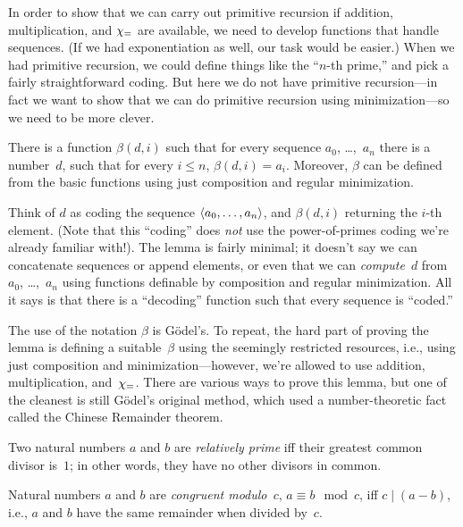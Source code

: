 \documentclass[../../../include/open-logic-section]{subfiles}
\begin{document}


In order to show that we can carry out primitive recursion if
addition, multiplication, and $\chi_{=}$ are available, we need to
develop functions that handle sequences. (If we had exponentiation as
well, our task would be easier.) When we had primitive recursion, we
could define things like the ``$n$-th prime,'' and pick a fairly
straightforward coding. But here we do not have primitive
recursion---in fact we want to show that we can do primitive recursion
using minimization---so we need to be more clever.  

\begin{lem}
There is a function $\beta(d,i)$ such that for every sequence $a_0$,
\dots,~$a_n$ there is a number~$d$, such that for every $i \le n$,
$\beta(d,i) = a_i$. Moreover, $\beta$ can be defined from the basic
functions using just composition and regular minimization.
\end{lem}

Think of $d$ as coding the sequence $\langle a_0, \dots, a_n \rangle$, and
$\beta(d,i)$ returning the $i$-th element. (Note that this ``coding''
does \emph{not} use the power-of-primes coding we're already familiar
with!). The lemma is fairly minimal; it doesn't say we can concatenate
sequences or append elements, or even that we can \emph{compute}~$d$
from $a_0$, \dots,~$a_n$ using functions definable by composition and
regular minimization. All it says is that there is a ``decoding''
function such that every sequence is ``coded.''

The use of the notation $\beta$ is G\"odel's. To repeat, the hard part
of proving the lemma is defining a suitable~$\beta$ using the
seemingly restricted resources, i.e., using just composition and
minimization---however, we're allowed to use addition, multiplication,
and~$\chi_{=}$. There are various ways to prove this lemma, but one of
the cleanest is still G\"odel's original method, which used a
number-theoretic fact called the Chinese Remainder theorem.

\begin{defn}
Two natural numbers $a$ and $b$ are \emph{relatively prime} iff their
greatest common divisor is~$1$; in other words, they have no other
divisors in common.
\end{defn}

\begin{defn}
Natural numbers $a$ and $b$ are \emph{congruent modulo~$c$}, $a \equiv b \mod c$, iff $c \mid (a-b)$, i.e., $a$ and $b$ have the
same remainder when divided by~$c$.
\end{defn}
\end{document}
